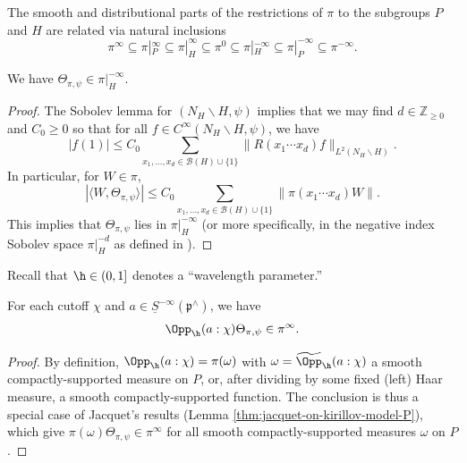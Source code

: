 The smooth and distributional parts of the restrictions of $\pi$ to the subgroups $P$ and $H$ are related via natural inclusions
\begin{equation*}
  \pi^\infty \subseteq \pi|_P^\infty \subseteq \pi|_H^\infty \subseteq \pi^0  \subseteq \pi|_H^{-\infty}
  \subseteq \pi|_P^{-\infty} \subseteq \pi^{-\infty}.
\end{equation*}
\begin{lemma}
  We have $\Theta_{\pi,\psi} \in \pi|_H^{-\infty}$.
\end{lemma}
\begin{proof}
  The Sobolev lemma for $(N_H \backslash H,\psi)$ implies that we may find $d \in \mathbb{Z}_{\geq 0}$ and $C_0 \geq 0$ so that for all $f \in C^\infty(N_H \backslash H, \psi)$, we have
  \begin{equation*}
    |f(1)| \leq C_0 \sum_{x_1, \dotsc, x_d \in \mathcal{B}(H) \cup \{1\}} \|R(x_1 \dotsb x_d) f\|_{L^2(N_H \backslash H)}.
  \end{equation*}
  In particular, for $W \in \pi$,
  \begin{equation*}
    |\langle W, \Theta_{\pi,\psi} \rangle| \leq C_0  \sum_{x_1, \dotsc, x_d \in \mathcal{B}(H) \cup \{1\}} \|\pi(x_1 \dotsb x_d) W\|.
  \end{equation*}
  This implies that $\Theta_{\pi,\psi}$ lies in $\pi|_H^{-\infty}$ (or more specifically, in the negative index Sobolev space $\pi|_H^{-d}$ as defined in \cite[\S3.2]{nelson-venkatesh-1}).
\end{proof}

Recall that $\h \in (0,1]$ denotes a ``wavelength parameter.''

\begin{lemma}
  For each cutoff $\chi$ and $a \in \underline{S}^{-\infty}(\mathfrak{p}^\wedge)$, we have
  \begin{equation*}
    \Opp_{\h}(a:\chi) \Theta_{\pi,\psi} \in \pi^\infty.
  \end{equation*}
\end{lemma}
\begin{proof}
  By definition, $\Opp_{\h}(a:\chi) = \pi(\omega)$ with $\omega = \widetilde{\Opp}_{\h}(a:\chi)$ a smooth compactly-supported measure on $P$, or, after dividing by some fixed (left) Haar measure, a smooth compactly-supported function.  The conclusion is thus a special case of Jacquet's results (Lemma \ref{thm:jacquet-on-kirillov-model-P}), which give $\pi(\omega) \Theta_{\pi,\psi} \in \pi^\infty$ for all smooth compactly-supported measures $\omega$ on $P$.
\end{proof}

